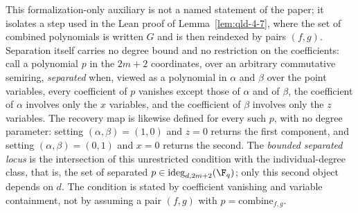 \begin{definition}
	\label{def:combine-map-separated-locus}
	\leanok
	This formalization-only auxiliary is not a named statement of the paper; it
	isolates a step used in the Lean proof of Lemma~\ref{lem:qld-4-7}, where the
	set of combined polynomials is written $G$ and is then reindexed by pairs
	$(f, g)$. Separation itself carries no degree bound and no restriction on
	the coefficients: call a polynomial $p$ in the $2m+2$ coordinates, over an
	arbitrary commutative semiring, \emph{separated} when, viewed as a
	polynomial in $\alpha$ and $\beta$ over the point variables, every
	coefficient of $p$ vanishes except those of $\alpha$ and of $\beta$, the
	coefficient of $\alpha$ involves only the $x$ variables, and the
	coefficient of $\beta$ involves only the $z$ variables. The recovery map is
	likewise defined for every such $p$, with no degree parameter: setting
	$(\alpha, \beta) = (1, 0)$ and $z = 0$ returns the first component, and
	setting $(\alpha, \beta) = (0, 1)$ and $x = 0$ returns the second. The
	\emph{bounded separated locus} is the intersection of this unrestricted
	condition with the individual-degree class, that is, the set of separated
	$p \in \mathrm{ideg}_{d,2m+2}(\F_q)$; only this second object depends on
	$d$. The condition is stated by coefficient vanishing and variable
	containment, not by assuming a pair $(f, g)$ with
	$p = \mathrm{combine}_{f,g}$.
\end{definition}

